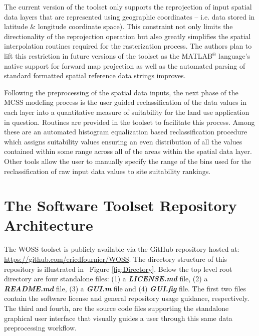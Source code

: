 The current version of the toolset only supports the reprojection of input spatial data layers that are represented using geographic coordinates -- i.e. data stored in latitude \& longitude coordinate space). This constraint not only limits the directionality of the reprojection operation but also greatly simplifies the spatial interpolation routines required for the rasterization process. The authors plan to lift this restriction in future versions of the toolset as the MATLAB$^{\circledR}$ language's native support for forward map projection as well as the automated parsing of standard formatted spatial reference data strings improves.   
            
Following the preprocessing of the spatial data inputs, the next phase of the MCSS modeling process is the user guided reclassification of the data values in each layer into a quantitative measure of suitability for the land use application in question. Routines are provided in the toolset to facilitate this process. Among these are an automated histogram equalization based reclassification procedure which assigns suitability values ensuring an even distribution of all the values contained within some range across all of the areas within the spatial data layer. Other tools allow the user to manually specify the range of the bins used for the reclassification of raw input data values to site suitability rankings. 

\section{The Software Toolset Repository Architecture}
    
The WOSS toolset is publicly available via the GitHub repository hosted at: \url{https://github.com/ericdfournier/WOSS}. The directory structure of this repository is illustrated in ~Figure \ref{fig:Directory}. Below the top level root directory are four standalone files: (1) a \textit{\textbf{LICENSE.md}} file, (2) a  \textit{\textbf{README.md}} file, (3) a \textit{\textbf{GUI.m}} file and (4) \textit{\textbf{GUI.fig}} file. The first two files contain the software license and general repository usage guidance, respectively. The third and fourth, are the source code files supporting the standalone graphical user interface that visually guides a user through this same data preprocessing workflow.

